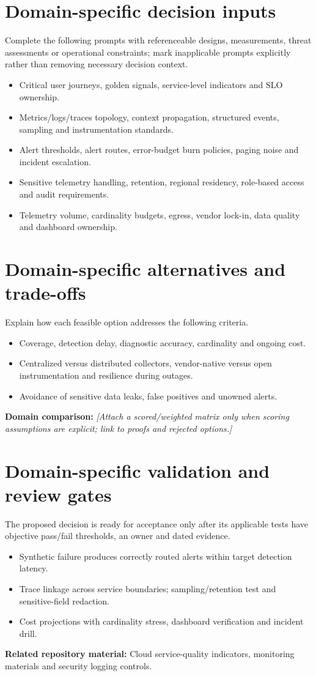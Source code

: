 \documentclass[11pt,letterpaper]{article}
\begin{document}
\section{Domain-specific decision inputs}
Complete the following prompts with referenceable designs, measurements,
threat assessments or operational constraints; mark inapplicable prompts
explicitly rather than removing necessary decision context.
\begin{itemize}
\item Critical user journeys, golden signals, service-level indicators and SLO ownership.
\item Metrics/logs/traces topology, context propagation, structured events, sampling and instrumentation standards.
\item Alert thresholds, alert routes, error-budget burn policies, paging noise and incident escalation.
\item Sensitive telemetry handling, retention, regional residency, role-based access and audit requirements.
\item Telemetry volume, cardinality budgets, egress, vendor lock-in, data quality and dashboard ownership.
\end{itemize}
\section{Domain-specific alternatives and trade-offs}
Explain how each feasible option addresses the following criteria.
\begin{itemize}
\item Coverage, detection delay, diagnostic accuracy, cardinality and ongoing cost.
\item Centralized versus distributed collectors, vendor-native versus open instrumentation and resilience during outages.
\item Avoidance of sensitive data leaks, false positives and unowned alerts.
\end{itemize}
\noindent\textbf{Domain comparison:} \emph{[Attach a scored/weighted matrix only
when scoring assumptions are explicit; link to proofs and rejected options.]}
\section{Domain-specific validation and review gates}
The proposed decision is ready for acceptance only after its applicable
tests have objective pass/fail thresholds, an owner and dated evidence.
\begin{itemize}
\item Synthetic failure produces correctly routed alerts within target detection latency.
\item Trace linkage across service boundaries; sampling/retention test and sensitive-field redaction.
\item Cost projections with cardinality stress, dashboard verification and incident drill.
\end{itemize}
\noindent\textbf{Related repository material:} Cloud service-quality indicators, monitoring materials and security logging controls.
\end{document}
